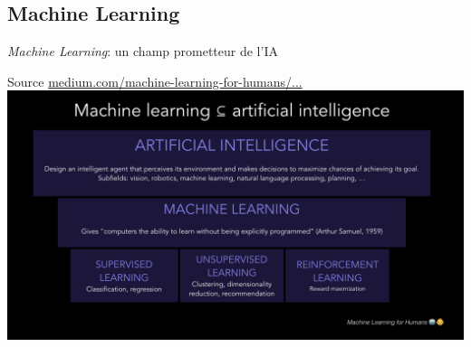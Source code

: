 \documentclass[11pt,serif,mathserif,compress,hyperref={colorlinks}]{beamer}
\begin{document}
\subsection{Machine Learning}

\begin{frame}{{\em Machine Learning}: un champ prometteur de l'IA}

  {\small Source \href{https://medium.com/machine-learning-for-humans/why-machine-learning-matters-6164faf1df12}
  {medium.com/machine-learning-for-humans/...}}\\[2mm]
  
  \hspace*{-10mm}\includegraphics[width=1.2\textwidth]{images/AI-from_MachineLearningForHumans.png}
  \vspace*{-8mm}
  
\end{frame}
\end{document}
